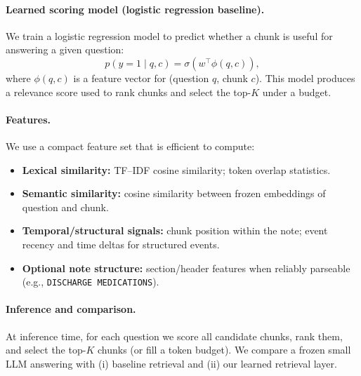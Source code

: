 \paragraph{Learned scoring model (logistic regression baseline).}
We train a logistic regression model to predict whether a chunk is useful for answering a given question:
\[
p(y=1 \mid q, c) = \sigma(w^\top \phi(q,c)),
\]
where $\phi(q,c)$ is a feature vector for (question $q$, chunk $c$). This model produces a relevance score used to rank chunks and select the top-$K$ under a budget.

\paragraph{Features.}
We use a compact feature set that is efficient to compute:
\begin{itemize}
    \item \textbf{Lexical similarity:} TF--IDF cosine similarity; token overlap statistics.
    \item \textbf{Semantic similarity:} cosine similarity between frozen embeddings of question and chunk.
    \item \textbf{Temporal/structural signals:} chunk position within the note; event recency and time deltas for structured events.
    \item \textbf{Optional note structure:} section/header features when reliably parseable (e.g., \texttt{DISCHARGE MEDICATIONS}).
\end{itemize}

\paragraph{Inference and comparison.}
At inference time, for each question we score all candidate chunks, rank them, and select the top-$K$ chunks (or fill a token budget). We compare a frozen small LLM answering with (i) baseline retrieval and (ii) our learned retrieval layer.